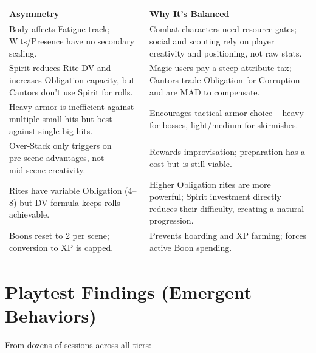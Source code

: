 \documentclass[11pt]{article}
\begin{document}
\begin{table}[h]
\centering
\begin{tabular}{p{5cm}p{9cm}}
\toprule
\textbf{Asymmetry} & \textbf{Why It's Balanced} \\
\midrule
Body affects Fatigue track; Wits/Presence have no secondary scaling. & Combat characters need resource gates; social and scouting rely on player creativity and positioning, not raw stats. \\
Spirit reduces Rite DV and increases Obligation capacity, but Cantors don't use Spirit for rolls. & Magic users pay a steep attribute tax; Cantors trade Obligation for Corruption and are MAD to compensate. \\
Heavy armor is inefficient against multiple small hits but best against single big hits. & Encourages tactical armor choice – heavy for bosses, light/medium for skirmishes. \\
Over‑Stack only triggers on pre‑scene advantages, not mid‑scene creativity. & Rewards improvisation; preparation has a cost but is still viable. \\
Rites have variable Obligation (4–8) but DV formula keeps rolls achievable. & Higher Obligation rites are more powerful; Spirit investment directly reduces their difficulty, creating a natural progression. \\
Boons reset to 2 per scene; conversion to XP is capped. & Prevents hoarding and XP farming; forces active Boon spending. \\
\bottomrule
\end{tabular}
\end{table}

\section{Playtest Findings (Emergent Behaviors)}
\label{sec:playtest-findings}

From dozens of sessions across all tiers:
\end{document}
